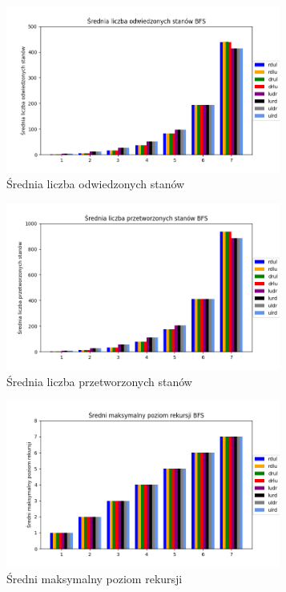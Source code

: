 \documentclass{classrep}
\begin{document}
{        \begin{figure}[!htbp]
            \centering
            \includegraphics[width=\textwidth, height=55mm]{wykresy/bfs2.png}
            \caption{Średnia liczba odwiedzonych stanów}
        \end{figure}

        \begin{figure}[!htbp]
            \centering
            \includegraphics[width=\textwidth, height=55mm]{wykresy/bfs3.png}
            \caption{Średnia liczba przetworzonych stanów}
        \end{figure}

        \begin{figure}[!htbp]
            \centering
            \includegraphics[width=\textwidth, height=55mm]{wykresy/bfs4.png}
            \caption{Średni maksymalny poziom rekursji}
        \end{figure}

}
\end{document}
